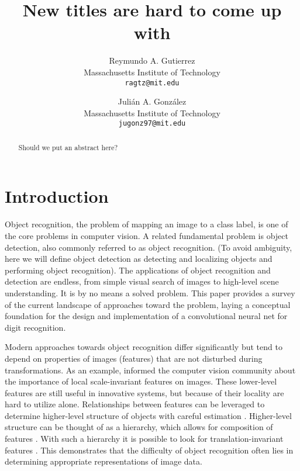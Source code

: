 \documentclass[10pt,twocolumn,letterpaper]{article}
\begin{document}
\title{New titles are hard to come up with}

\author{Reymundo A. Gutierrez\\
Massachusetts Institute of Technology\\
{\tt\small ragtz@mit.edu}\\
\and
Juli\'{a}n A. Gonz\'{a}lez\\
Massachusetts Institute of Technology\\
{\tt\small jugonz97@mit.edu}
}

\maketitle

\begin{abstract}
   Should we put an abstract here?
\end{abstract}

\section{Introduction}

Object recognition, the problem of mapping an image to a class label, is one of the core
problems in computer vision.
A related fundamental problem is object detection, also commonly referred to as object recognition.
(To avoid ambiguity, here we will define object detection as detecting and localizing objects and
performing object recognition).
The applications of object recognition and detection are endless, from simple visual search of
images to high-level scene understanding. It is by no means a solved problem.
This paper provides a survey of the current landscape of approaches toward the problem,
laying a conceptual foundation for the design and implementation of a convolutional neural net for
digit recognition.

Modern approaches towards object recognition differ significantly but tend to depend on
properties of images (features) that are not disturbed during transformations.
As an example, \cite{LoweObjSIFT} informed the computer vision community about the importance of
local scale-invariant features on images.
These lower-level features are still useful in innovative systems, but because of their
locality are hard to utilize alone.
Relationships between features can be leveraged to determine higher-level structure of
objects with careful estimation \cite{PartModels}.
Higher-level structure can be thought of as a hierarchy, which allows for composition of features \cite{HintonDBN}.
With such a hierarchy it is possible to look for translation-invariant features \cite{CDBN}.
This demonstrates that the difficulty of object recognition often lies in determining
appropriate representations of image data.
\end{document}
